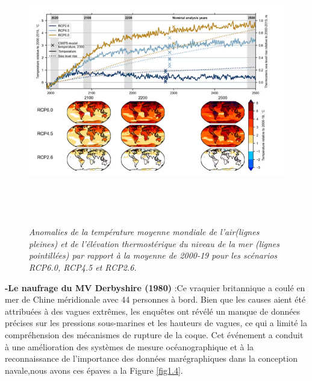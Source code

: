 \documentclass[a4paper,12pt,openany]{report}
\begin{document}
\begin{figure}[H]
	\begin{center}
		 \begin{minipage}{\textwidth}
		    \begin{center}
		    \includegraphics[width=1\textwidth,height=4.6in]{images/Anomilie_de_T.png}
		    \end{center}
		    \end{minipage}
		
		\caption{\emph{ Anomalies de la température moyenne mondiale de l’air(lignes pleines) et de l'élévation thermostérique du niveau de la mer (lignes pointillées) par rapport à la moyenne de 2000-19 pour les scénarios RCP6.0, RCP4.5 et RCP2.6.\cite{Bianchi2017}\label{Fig 1.1} }} 
	\end{center}
\end{figure}
\quad\textbf{-Le naufrage du MV Derbyshire (1980) }:Ce vraquier britannique a coulé en mer de Chine méridionale avec 44 personnes à bord. Bien que les causes aient été attribuées à des vagues extrêmes, les enquêtes ont révélé un manque de données précises sur les pressions sous-marines et les hauteurs de vagues, ce qui a limité la compréhension des mécanismes de rupture de la coque. Cet événement a conduit à une amélioration des systèmes de mesure océanographique et à la reconnaissance de l’importance des données marégraphiques dans la conception navale\cite{Gaillarde2001},nous avons ces épaves a la Figure \ref{fig1.4}.
\end{document}
